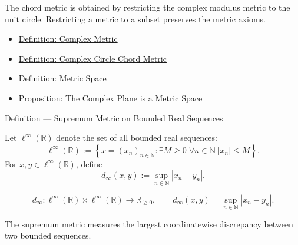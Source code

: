 \begin{remark*}[Interpretation]
The chord metric is obtained by restricting the complex modulus metric to the
unit circle.  Restricting a metric to a subset preserves the metric axioms.
\end{remark*}


\begin{dependencies}
\begin{itemize}
  \item \hyperref[def:complex-metric]{Definition: Complex Metric}
  \item \hyperref[def:complex-circle-chord-metric]{Definition: Complex Circle Chord Metric}
  \item \hyperref[def:metric-space]{Definition: Metric Space}
  \item \hyperref[prop:complex-plane-metric-space]{Proposition: The Complex Plane is a Metric Space}
\end{itemize}
\end{dependencies}

\begin{definitionbox}{Definition --- Supremum Metric on Bounded Real Sequences}
\begin{definition}
\label{def:bounded-real-sequence-space}
Let \(\ell^\infty(\mathbb{R})\) denote the set of all bounded real sequences:
\[
  \ell^\infty(\mathbb{R})
  :=
  \left\{x=(x_n)_{n\in\mathbb{N}}:
  \exists M\geq 0\;\forall n\in\mathbb{N}\; |x_n|\leq M\right\}.
\]
For \(x,y\in\ell^\infty(\mathbb{R})\), define
\[
  d_\infty(x,y)
  :=
  \sup_{n\in\mathbb{N}} |x_n-y_n|.
\]
\end{definition}
\end{definitionbox}

\begin{remark*}
\[
d_\infty:
\ell^\infty(\mathbb{R})\times\ell^\infty(\mathbb{R})
\to
\mathbb{R}_{\geq 0},
\qquad
d_\infty(x,y)=\sup_{n\in\mathbb{N}} |x_n-y_n|.
\]
\end{remark*}

\begin{remark*}[Interpretation]
The supremum metric measures the largest coordinatewise discrepancy between
two bounded sequences.
\end{remark*}

\DefinitionalRoot

